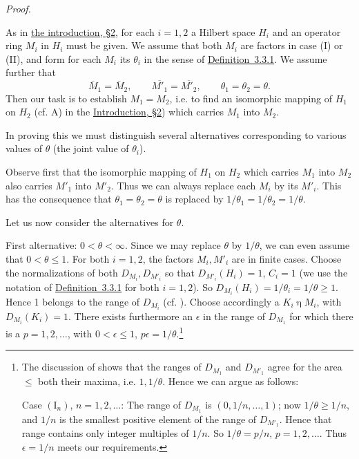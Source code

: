 \documentclass[b5paper,twoside]{article}
\newcommand{\defref}[2]{\hyperref[#1]{\mbox{Definition~#2}}}
\theoremstyle{mvnplain}
\renewenvironment{proof}[1][Proof]{%
  \par\addvspace{0.35\baselineskip}%
  \noindent\textit{#1.}\ \normalfont\ignorespaces
}{%
  \par\addvspace{0.35\baselineskip}%
}
\newcommand{\M}{\mathbf M}
\newcommand{\Hilbert}{\mathfrak H}
\def\M{M}%
\def\Hilbert{H}%
\def\widetilde#1{#1}%
\def\mathfrak#1{#1}%
\begin{document}
\begin{proof}
As in \hyperref[intro:2]{the introduction, \S2}, for each \(i=1,2\) a Hilbert space
\(\Hilbert_i\) and an operator ring \(\M_i\) in \(\Hilbert_i\) must be given.
We assume that both \(\M_i\) are factors in case (I) or (II), and form for each
\(\M_i\) its \(\theta_i\) in the sense of \defref{def:3.3.1}{3.3.1}. We
assume further that
\[
  \overline{\M}_1=\overline{\M}_2,\qquad
 \overline{\M'_1}=\overline{\M'_2},\qquad
  \theta_1=\theta_2=\theta.
\]
Then our task is to establish \(\widetilde{\M}_1=\widetilde{\M}_2\), i.e. to
find an isomorphic mapping of \(\Hilbert_1\) on \(\Hilbert_2\) (cf. A) in the
\hyperref[intro:2]{Introduction, \S2}) which carries \(\M_1\) into \(\M_2\).

In proving this we must distinguish several alternatives corresponding to
various values of \(\theta\) (the joint value of \(\theta_i\)).

Observe first that the isomorphic mapping of \(\Hilbert_1\) on
\(\Hilbert_2\) which carries \(\M_1\) into \(\M_2\) also carries
\(\M'_1\) into \(\M'_2\). Thus we can always replace each \(\M_i\) by its
\(\M'_i\). This has the consequence that
\(\theta_1=\theta_2=\theta\) is replaced by
\(1/\theta_1=1/\theta_2=1/\theta\).

Let us now consider the alternatives for \(\theta\).

First alternative: \(0<\theta<\infty\). Since we may replace \(\theta\) by
\(1/\theta\), we can even assume that \(0<\theta\leq1\). For both
\(i=1,2\), the factors \(\M_i,\M'_i\) are in finite cases. Choose the
normalizations of both \(D_{\M_i},D_{\M'_i}\) so that
\(D_{\M'_i}(\Hilbert_i)=1\), \(C_i=1\) (we use the notation of
\defref{def:3.3.1}{3.3.1} for both \(i=1,2\)). So
\(D_{\M_i}(\Hilbert_i)=1/\theta_i=1/\theta\geq1\). Hence 1 belongs to the
range of \(D_{\M_i}\) (cf. \cite[p.~182, the discussion of the ranges of
\(\Delta,\Delta_0,\Delta',\Delta'_0\) in Theorem~X and preceding it]{ref5}).
Choose accordingly a \(\mathfrak K_i\mathrel{\eta}\M_i\), with
\(D_{\M_i}(\mathfrak K_i)=1\). There exists furthermore an \(\epsilon\) in
the range of \(D_{\M_1}\) for which there is a \(p=1,2,\ldots\), with
\(0<\epsilon\leq1\), \(p\epsilon=1/\theta\).\footnote{The discussion of
\cite[p.~182]{ref5} shows that the ranges of \(D_{\M_1}\) and
\(D_{\M'_1}\) agree for the area \(\leq\) both their maxima, i.e.
\(1,1/\theta\). Hence we can argue as follows:

Case \((\mathrm I_n)\), \(n=1,2,\ldots\): The range of \(D_{\M_1}\) is
\((0,1/n,\ldots,1)\); now \(1/\theta\geq1/n\), and \(1/n\) is the smallest
positive element of the range of \(D_{\M'_1}\). Hence that range contains only
integer multiples of \(1/n\). So \(1/\theta=p/n\), \(p=1,2,\ldots\). Thus
\(\epsilon=1/n\) meets our requirements.

}
\end{proof}
\end{document}
